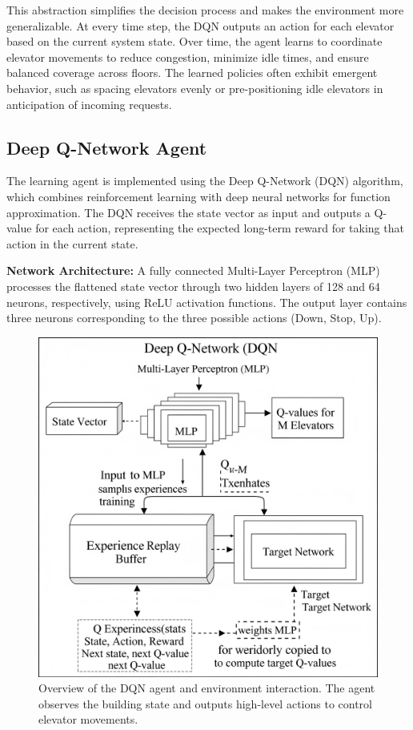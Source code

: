 \documentclass[conference]{IEEEtran}
\begin{document}
This abstraction simplifies the decision process and makes the environment more generalizable. At every time step, the DQN outputs an action for each elevator based on the current system state. Over time, the agent learns to coordinate elevator movements to reduce congestion, minimize idle times, and ensure balanced coverage across floors. The learned policies often exhibit emergent behavior, such as spacing elevators evenly or pre-positioning idle elevators in anticipation of incoming requests.

\subsection{Deep Q-Network Agent}
The learning agent is implemented using the Deep Q-Network (DQN) algorithm\cite{mnih2015human}, which combines reinforcement learning with deep neural networks for function approximation. The DQN receives the state vector as input and outputs a Q-value for each action, representing the expected long-term reward for taking that action in the current state.

\textbf{Network Architecture:}  
A fully connected Multi-Layer Perceptron (MLP) processes the flattened state vector through two hidden layers of 128 and 64 neurons, respectively, using ReLU activation functions. The output layer contains three neurons corresponding to the three possible actions (Down, Stop, Up).  

\begin{figure}[htbp]
\centering
\includegraphics[width=\columnwidth]{dqn_architecture.png}
\caption{Overview of the DQN agent and environment interaction. The agent observes the building state and outputs high-level actions to control elevator movements.}
\label{fig:dqn_agent}
\end{figure}
\end{document}
